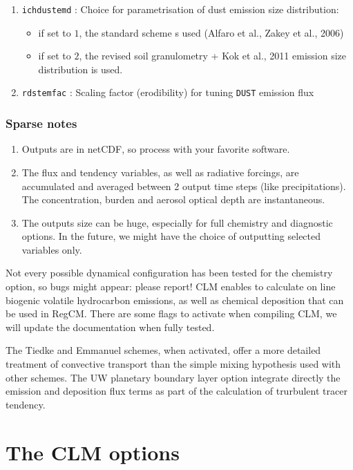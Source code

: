 \begin{enumerate}
\begin{itemize}
    \end{itemize}
  \item \verb=ichdustemd= : Choice for parametrisation of dust emission size
    distribution:
    \begin{itemize}
      \item if set to $1$, the standard scheme s used (Alfaro et al.,
        Zakey et al., 2006)
      \item if set to $2$, the revised soil granulometry + Kok et al., 2011
        emission size distribution is used.
    \end{itemize}
  \item \verb=rdstemfac= : Scaling factor (erodibility) for tuning  \verb=DUST= emission flux
\end{enumerate}

\subsubsection{Sparse notes}

\begin{enumerate}
  \item Outputs are in netCDF, so process with your favorite software.
  \item The flux and tendency variables, as well as radiative forcings,
    are accumulated and averaged between 2 output time steps (like
    precipitations). The concentration, burden and aerosol optical depth
    are instantaneous.
  \item The outputs size can be huge, especially for full chemistry and
    diagnostic options. In the future, we might have the choice of outputting
    selected variables only.
\end{enumerate}

Not every possible dynamical configuration has been tested for the chemistry
option, so bugs might appear: please report!
CLM enables to calculate on line biogenic volatile hydrocarbon emissions, as
well as chemical deposition that can be used in RegCM. There are some flags to
activate when compiling CLM, we will update the documentation when fully tested.

The Tiedke and Emmanuel schemes, when activated, offer a more detailed
treatment of convective transport than the simple mixing hypothesis used with
other schemes.
The UW planetary boundary layer option integrate directly the emission and
deposition flux terms as part of the calculation of trurbulent tracer tendency.

\section{The CLM options}
\label{clm}

